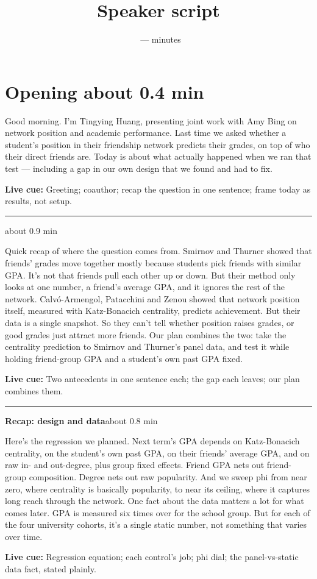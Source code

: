 \documentclass[11pt]{article}
\title{Speaker script\\[0.25em]\large \PaperShortTitle}
\author{\PaperAuthors}
\date{\VenueDate\ --- \VenueShort\quad 10 minutes}
\newcommand{\Cue}[1]{\par\nobreak\smallskip\noindent\textcolor{ScriptGray}{\footnotesize
  \textbf{Live cue:} #1}\par}
\newcommand{\scriptopening}[2]{%
  \Needspace{10\baselineskip}%
  \section*{Opening \hfill\normalfont\small\textcolor{ScriptGray}{#1}}
  #2\par}
\newcommand{\scriptframe}[3]{%
  \Needspace{9\baselineskip}%
  \par\medskip\noindent\textcolor{ScriptBlue}{\rule{\linewidth}{0.55pt}}%
  \par\smallskip\noindent
  \textbf{#1}\hfill\textcolor{ScriptGray}{\small #2}\par\smallskip
  #3\par}
\begin{document}
\maketitle
\thispagestyle{fancy}

\scriptopening{about 0.4 min}{%
  Good morning. I'm Tingying Huang, presenting joint work with Amy Bing on
  network position and academic performance. Last time we asked whether a
  student's position in their friendship network predicts their grades, on
  top of who their direct friends are. Today is about what actually happened
  when we ran that test --- including a gap in our own design that we found
  and had to fix.
  \Cue{Greeting; coauthor; recap the question in one sentence; frame today as results, not setup.}
}

\scriptframe{\KeyQuestion}{about 0.9 min}{%
  Quick recap of where the question comes from. Smirnov and Thurner showed
  that friends' grades move together mostly because students pick friends
  with similar GPA. It's not that friends pull each other up or down. But
  their method only looks at one number, a friend's average GPA, and it
  ignores the rest of the network. Calv{\'o}-Armengol, Patacchini and Zenou
  showed that network position itself, measured with Katz-Bonacich
  centrality, predicts achievement. But their data is a single snapshot. So
  they can't tell whether position raises grades, or good grades just
  attract more friends. Our plan combines the two: take the centrality
  prediction to Smirnov and Thurner's panel data, and test it while holding
  friend-group GPA and a student's own past GPA fixed.
  \Cue{Two antecedents in one sentence each; the gap each leaves; our plan combines them.}
}

\scriptframe{Recap: design and data}{about 0.8 min}{%
  Here's the regression we planned. Next term's GPA depends on Katz-Bonacich
  centrality, on the student's own past GPA, on their friends' average GPA,
  and on raw in- and out-degree, plus group fixed effects. Friend GPA nets
  out friend-group composition. Degree nets out raw popularity. And we sweep
  phi from near zero, where centrality is basically popularity, to near its
  ceiling, where it captures long reach through the network. One fact about
  the data matters a lot for what comes later. GPA is measured six times over
  for the school group. But for each of the four university cohorts, it's a
  single static number, not something that varies over time.
  \Cue{Regression equation; each control's job; phi dial; the panel-vs-static data fact, stated plainly.}
}
\end{document}
